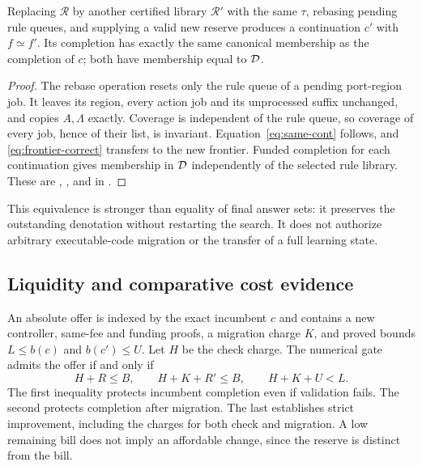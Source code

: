 \begin{theorem}\label{thm:rebase}
Replacing $\mathcal R$ by another certified library $\mathcal R'$ with the same $\tau$, rebasing pending rule queues, and supplying a valid new reserve produces a continuation $c'$ with $f\simeq f'$. Its completion has exactly the same canonical membership as the completion of $c$; both have membership equal to $\mathcal D$.
\end{theorem}
\begin{proof}
The rebase operation resets only the rule queue of a pending port-region job. It leaves its region, every action job and its unprocessed suffix unchanged, and copies $A,\Lambda$ exactly. Coverage is independent of the rule queue, so coverage of every job, hence of their list, is invariant. Equation~\eqref{eq:same-cont} follows, and \eqref{eq:frontier-correct} transfers to the new frontier. Funded completion for each continuation gives membership in $\mathcal D$ independently of the selected rule library. These are , , and  in .
\end{proof}
This equivalence is stronger than equality of final answer sets: it preserves the outstanding denotation without restarting the search. It does not authorize arbitrary executable-code migration or the transfer of a full learning state.

\subsection{Liquidity and comparative cost evidence}
An absolute offer is indexed by the exact incumbent $c$ and contains a new controller, same-fee and funding proofs, a migration charge $K$, and proved bounds $L\le b(c)$ and $b(c')\le U$. Let $H$ be the check charge. The numerical gate admits the offer if and only if
\begin{equation}\label{eq:absolute-gate}
 H+R\le B,\qquad H+K+R'\le B,\qquad H+K+U<L.
\end{equation}
The first inequality protects incumbent completion even if validation fails. The second protects completion after migration. The last establishes strict improvement, including the charges for both check and migration. A low remaining bill does not imply an affordable change, since the reserve is distinct from the bill.

